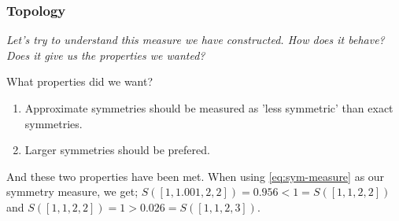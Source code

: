 
\subsubsection{Topology}

\begin{displayquote}
\textsl{Let's try to understand this measure we have constructed. How does it behave?
Does it give us the properties we wanted?}
\end{displayquote}

What properties did we want?

\begin{enumerate}
\tightlist
	\item Approximate symmetries should be measured as 'less symmetric' than exact symmetries.
	\item Larger symmetries should be prefered.
\end{enumerate}

And these two properties have been met. When using \ref{eq:sym-measure} as our symmetry measure, we get;
$S([1,1.001,2,2]) = 0.956 < 1 = S([1,1,2,2])$ and $S([1,1,2,2]) = 1  >  0.026 = S([1,1,2,3])$.

